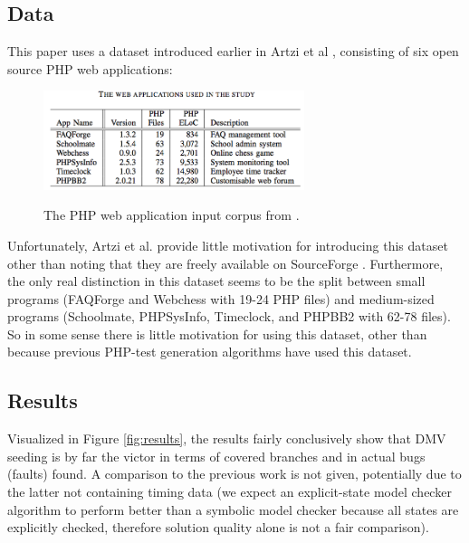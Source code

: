 \documentclass{sig-alternate-05-2015}
\begin{document}
\subsection{Data}
This paper uses a dataset introduced earlier in Artzi et al \cite{artzi2010finding}, consisting of six open source PHP web applications:

\begin{figure}[!h]
\centering
\includegraphics[width=3in]{images/php.png}
\label{fig:php}
\caption{The PHP web application input corpus from \cite{alshahwan2011automated}.}
\end{figure}

Unfortunately, Artzi et al. provide little motivation for introducing this dataset other than noting that they are freely available on SourceForge \cite{sourceforge}. Furthermore, the only real distinction in this dataset seems to be the split between small programs (FAQForge and Webchess with 19-24 PHP files) and medium-sized programs (Schoolmate, PHPSysInfo, Timeclock, and PHPBB2 with 62-78 files). So in some sense there is little motivation for using this dataset, other than because previous PHP-test generation algorithms have used this dataset. 


\subsection{Results}
Visualized in Figure \ref{fig:results}, the results fairly conclusively show that DMV seeding is by far the victor in terms of covered branches and in actual bugs (faults) found. A  comparison to the previous work \cite{artzi2010finding} is not given, potentially due to the latter not containing timing data (we expect an explicit-state model checker algorithm to perform better than a symbolic model checker because all states are explicitly checked, therefore solution quality alone is not a fair comparison). 
\end{document}
